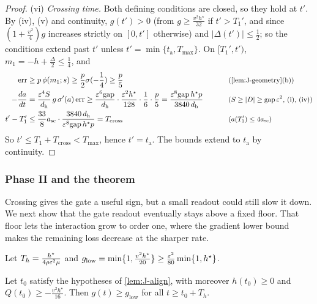 \begin{proof}
\noindent(vi) \emph{Crossing time.} Both defining conditions are closed, so they hold at $t'$. By (iv), (v) and continuity, $g(t')>0$ (from
$g\ge\frac{v^2h^\star}{32}$ if $t'>T_1'$, and since $(1+\frac{v^2}{4})g$ increases strictly on $[0,t']$ otherwise) and $|\Delta(t')|\le\frac{1}{2}$; so the
conditions extend past $t'$ unless $t'=\min\{t_{\mathrm a},T_{\max}\}$. On $[T_1',t')$, $m_1=-h+\frac{\Delta}{2}\le\frac{1}{4}$, and
\begin{alignat*}{2}
 \mathrm{err}&\ge p\,\phi(m_1;s)\ge\tfrac{p}{2}\sigma(-\tfrac{1}{4})\ge\tfrac{p}{5} &\qquad& \why{\cref{lem:J-geometry}(b)}\\
 -\ddt{a}&=\frac{\initscale^4S}{d_{\mathrm h}}\,g\,\sigma'(a)\,\mathrm{err}\ge\frac{\initscale^6\mathrm{gap}}{d_{\mathrm h}}\cdot\frac{\initscale^2h^\star}{128}\cdot\frac{1}{6}\cdot\frac{p}{5}
 =\frac{\initscale^8\mathrm{gap}\,h^\star p}{3840\,d_{\mathrm h}} && \why{$S\ge|D|\ge\mathrm{gap}\,\initscale^2$, (i), (iv)}\\
 t'-T_1'&\le\frac{33}{8}a_{\mathrm{sc}}\cdot\frac{3840\,d_{\mathrm h}}{\initscale^8\mathrm{gap}\,h^\star p}=T_{\mathrm{cross}} && \why{$a(T_1')\le4a_{\mathrm{sc}}$}
\end{alignat*}
So $t'\le T_1+T_{\mathrm{cross}}<T_{\max}$, hence $t'=t_{\mathrm a}$. The bounds extend to $t_{\mathrm a}$ by continuity.
\end{proof}

\subsubsection{Phase II and the theorem}

Crossing gives the gate a useful sign, but a small readout could still slow it down. We next show that the gate readout eventually
stays above a fixed floor. That floor lets the interaction grow to order one, where the gradient lower bound makes the remaining
loss decrease at the sharper rate.

Let $T_h=\frac{h^\star}{4\rho\varepsilon^2\mu}$ and $g_{\mathrm{low}}=\min\{1,\frac{v^2h^\star}{20}\}\ge\frac{\varepsilon^2}{80}\min\{1,h^\star\}$.

\begin{lemma}
\label{lem:J-floor}
Let $t_0$ satisfy the hypotheses of \cref{lem:J-align}, with moreover $h(t_0)\ge0$ and $Q(t_0)\ge-\frac{v^2h^\star}{16}$. Then $g(t)\ge g_{\mathrm{low}}$ for all
$t\ge t_0+T_h$.
\end{lemma}

